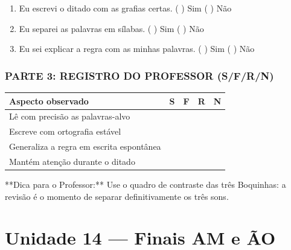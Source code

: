 \begin{exercicio}
\begin{enumerate}[label=\alph*)]
  \item Eu escrevi o ditado com as grafias certas.  \quad ( ) Sim   ( ) Não

  \item Eu separei as palavras em sílabas.  \quad ( ) Sim   ( ) Não

  \item Eu sei explicar a regra com as minhas palavras.  \quad ( ) Sim   ( ) Não

\end{enumerate}

\subsection*{PARTE 3: REGISTRO DO PROFESSOR (S/F/R/N)}

\begin{center}
\renewcommand{\arraystretch}{1.4}
\begin{tabular}{@{}p{9cm}cccc@{}}
\toprule
Aspecto observado & S & F & R & N \\
\midrule
Lê com precisão as palavras-alvo & & & & \\
Escreve com ortografia estável & & & & \\
Generaliza a regra em escrita espontânea & & & & \\
Mantém atenção durante o ditado & & & & \\
\bottomrule\end{tabular}\end{center}

\end{exercicio}

\begin{dica}
**Dica para o Professor:** Use o quadro de contraste das três Boquinhas: a revisão é o momento de separar definitivamente os três sons.
\end{dica}


\chapter{Unidade 14 --- Finais AM e ÃO}


